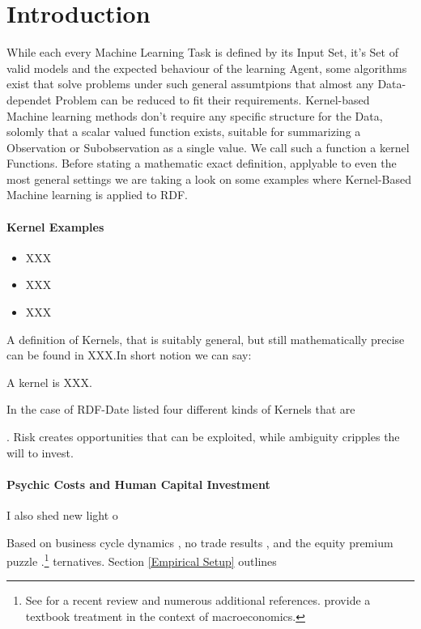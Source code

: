 
\section{Introduction}
While each every Machine Learning Task is defined by its Input Set, it's Set of valid models and the expected behaviour of the learning Agent, some algorithms exist that solve problems under such general assumtpions that almost any Data-dependet Problem can be reduced to fit their requirements. Kernel-based Machine learning methods don't require any specific structure for the Data, solomly that a scalar valued function exists, suitable for summarizing a Observation or Subobservation as a single value. We call such a function a kernel Functions. Before stating a mathematic exact definition, applyable to even the most general settings we are taking a look on some examples where Kernel-Based Machine learning is applied to RDF. 

\paragraph{Kernel Examples}
\begin{itemize}
\item XXX
\item XXX
\item XXX
\end{itemize}

A definition of Kernels, that is suitably general, but still mathematically precise can be found in XXX.In short notion we can say:

\begin{Definition}
A kernel is XXX.
\end{Definition}

In the case of RDF-Date \citet{mainsource} listed four different kinds of Kernels that are 


%
. Risk creates opportunities that can be exploited, while ambiguity cripples the will to invest.

\paragraph{Psychic Costs and Human Capital Investment} I also shed new light o

\noindent Based on business cycle dynamics \citet{mainsource}, no trade results \citep{Dow.1992}, and the equity premium puzzle \citep{Hansen.1999}.\footnote{See \citet{mainsource} for a recent review and numerous additional references. \citet{Hansen.2016} provide a textbook treatment in the context of macroeconomics.} ternatives. Section \ref{Empirical Setup} outlines 
